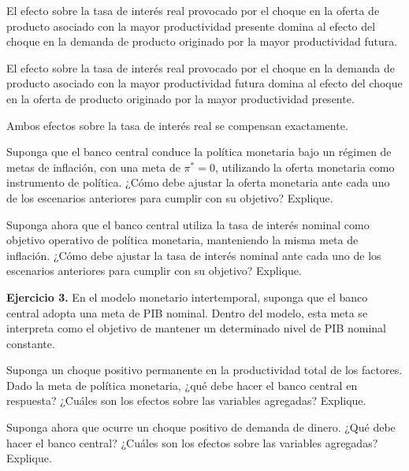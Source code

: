 \documentclass[11pt]{article}
\let\enumerateoriginal\enumerate
\let\endenumerateoriginal\endenumerate
\renewenvironment{enumerate}{%
  \enumerateoriginal
  \setlength{\itemsep}{0.5em}%
  \setlength{\parsep}{0pt}%
  \setlength{\topsep}{0.4em}%
}{\endenumerateoriginal}
\begin{document}
\begin{enumerate}
    \item El efecto sobre la tasa de interés real provocado por el choque en la oferta de producto asociado con la mayor productividad presente domina al efecto del choque en la demanda de producto originado por la mayor productividad futura.

    \item El efecto sobre la tasa de interés real provocado por el choque en la demanda de producto asociado con la mayor productividad futura domina al efecto del choque en la oferta de producto originado por la mayor productividad presente.

    \item Ambos efectos sobre la tasa de interés real se compensan exactamente.

    \item Suponga que el banco central conduce la política monetaria bajo un régimen de metas de inflación, con una meta de $\pi^*=0$, utilizando la oferta monetaria como instrumento de política. ¿Cómo debe ajustar la oferta monetaria ante cada uno de los escenarios anteriores para cumplir con su objetivo? Explique.

    \item Suponga ahora que el banco central utiliza la tasa de interés nominal como objetivo operativo de política monetaria, manteniendo la misma meta de inflación. ¿Cómo debe ajustar la tasa de interés nominal ante cada uno de los escenarios anteriores para cumplir con su objetivo? Explique.

\end{enumerate}


\vspace{0.5em}

\textbf{Ejercicio 3.} En el modelo monetario intertemporal, suponga que el banco central adopta una meta de PIB nominal. Dentro del modelo, esta meta se interpreta como el objetivo de mantener un determinado nivel de PIB nominal constante.
\begin{enumerate}
  \item Suponga un choque positivo permanente en la productividad total de los factores. Dado la meta de política monetaria, ¿qué debe hacer el banco central en respuesta? ¿Cuáles son los efectos sobre las variables agregadas? Explique.

  \item Suponga ahora que ocurre un choque positivo de demanda de dinero. ¿Qué debe hacer el banco central? ¿Cuáles son los efectos sobre las variables agregadas? Explique.
\end{enumerate}
\end{document}
